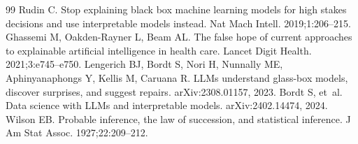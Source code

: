 \documentclass[11pt]{article}
\begin{document}
\begin{thebibliography}{99}
 Rudin C. Stop explaining black box machine learning models for high stakes decisions and use interpretable models instead. Nat Mach Intell. 2019;1:206--215.
 Ghassemi M, Oakden-Rayner L, Beam AL. The false hope of current approaches to explainable artificial intelligence in health care. Lancet Digit Health. 2021;3:e745--e750.
 Lengerich BJ, Bordt S, Nori H, Nunnally ME, Aphinyanaphongs Y, Kellis M, Caruana R. LLMs understand glass-box models, discover surprises, and suggest repairs. arXiv:2308.01157, 2023.
 Bordt S, et~al. Data science with LLMs and interpretable models. arXiv:2402.14474, 2024.
 Wilson EB. Probable inference, the law of succession, and statistical inference. J Am Stat Assoc. 1927;22:209--212.
\end{thebibliography}
\end{document}
